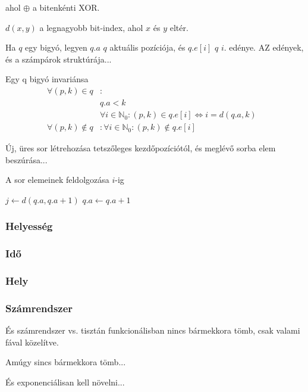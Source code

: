 \documentclass[12pt]{report}
\begin{document}
ahol $\oplus$ a bitenkénti XOR.

$d(x, y)$ a legnagyobb bit-index, ahol $x$ és $y$ eltér.

Ha $q$ egy bigyó, legyen $q.a$ $q$ aktuális pozíciója, és $q.e[i]$ $q$ $i$. edénye. AZ edények, és a számpárok struktúrája...

Egy q bigyó invariánsa
\begin{align*}
\forall (p, k) \in q &: &\\ 
	& q.a < k\\
	& \forall i \in \mathbb{N}_{0}: (p, k) \in q.e[i] \iff i=d(q.a, k) \\
\forall (p, k) \not\in q &: \forall i \in \mathbb{N}_{0}: (p, k) \not\in q.e[i]
\end{align*}

Új, üres sor létrehozása tetszőleges kezdőpozíciótól, és meglévő sorba elem beszúrása...

A sor elemeinek feldolgozása $i$-ig
\begin{algorithmic}[1]
	\State $j \gets d(q.a, q.a + 1)$
	\State $q.a \gets q.a + 1$
		\State {}
			\State {}
		\Else
			\State {}
		\EndIf
	\EndFor
\EndWhile
\end{algorithmic}

\subsubsection{Helyesség}

\subsubsection{Idő}

\subsubsection{Hely}

\subsubsection{Számrendszer}

És számrendszer vs. tisztán funkcionálisban nincs bármekkora tömb, csak valami fával közelítve.

Amúgy sincs bármekkora tömb...

És exponenciálisan kell növelni...
\end{document}
